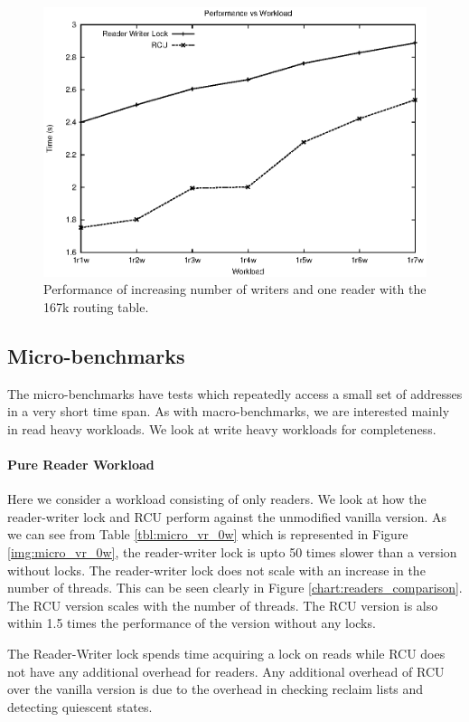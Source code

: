 \documentclass{article}
\begin{document}
\begin{figure}[tph]
\includegraphics[scale = 0.6]{../images/graphs/macro_1r_vw}
\caption{Performance of increasing number of writers and one reader with the 167k routing table.}
\label{img:macro_1r_vw}
\end{figure}

\subsection{Micro-benchmarks}
\label{sec:microbenchmarks}
The micro-benchmarks have tests which repeatedly access a small set of addresses in a very short time span.
As with macro-benchmarks, we are interested mainly in read heavy workloads. We look at write heavy workloads for completeness.

\paragraph{Pure Reader Workload}
Here we consider a workload consisting of only readers. We look at how the reader-writer lock and RCU perform against the unmodified vanilla version.
As we can see from Table \ref{tbl:micro_vr_0w} which is represented in Figure \ref{img:micro_vr_0w}, the reader-writer lock is upto 50 times slower than a version without locks.
The reader-writer lock does not scale with an increase in the number of threads. This can be seen clearly in Figure \ref{chart:readers_comparison}. The RCU version scales with the number of threads. The RCU version is also within 1.5 times the performance of the version without any locks.

The Reader-Writer lock spends time acquiring a lock on reads while RCU does not have any additional overhead for readers. Any additional overhead of RCU over the vanilla version is due to the overhead in checking reclaim lists and detecting quiescent states.
\end{document}
